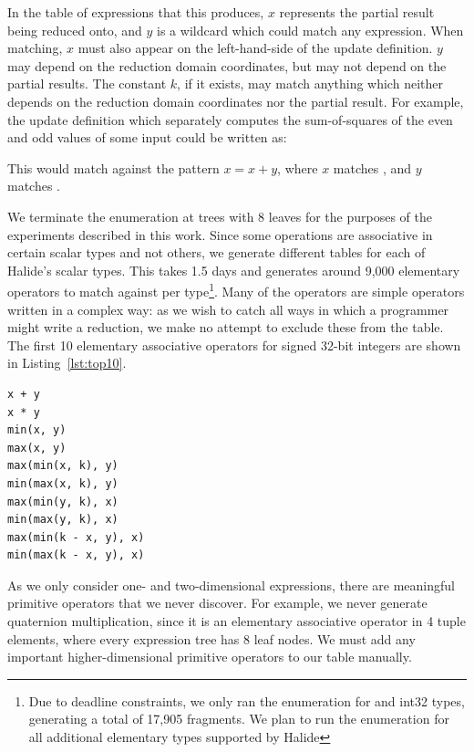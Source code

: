 In the table of expressions that this produces, $x$ represents the partial result being reduced onto, and $y$ is a wildcard which could match any expression. When matching, $x$ must also appear on the left-hand-side of the update definition. $y$ may depend on the reduction domain coordinates, but may not depend on the partial results. The constant $k$, if it exists, may match anything which neither depends on the reduction domain coordinates nor the partial result. For example, the update definition which separately computes the sum-of-squares of the even and odd values of some input  could be written as:


This would match against the pattern $x = x + y$, where $x$ matches , and $y$ matches .

We terminate the enumeration at trees with 8 leaves for the purposes of the experiments described in this work. Since some operations are associative in certain scalar types and not others, we generate different tables for each of Halide's scalar types.  This takes 1.5 days and generates around 9,000 elementary operators to match against per type\footnote{Due to deadline constraints, we only ran the enumeration for  and {int32} types, generating a total of 17,905 fragments.  We plan to run the enumeration for all additional elementary types supported by Halide}. Many of the operators are simple operators written in a complex way: as we wish to catch all ways in which a programmer might write a reduction, we make no attempt to exclude these from the table. The first 10 elementary associative operators for signed 32-bit integers are shown in Listing~\ref{lst:top10}.

\begin{lstlisting}[caption={The first 10 elementary associative operators for 32-bit signed integers}, label={lst:top10}]
x + y
x * y
min(x, y)
max(x, y)
max(min(x, k), y)
min(max(x, k), y)
max(min(y, k), x)
min(max(y, k), x)
max(min(k - x, y), x)
min(max(k - x, y), x)
\end{lstlisting}


As we only consider one- and two-dimensional expressions, there are meaningful primitive operators that we never discover. For example, we never generate quaternion multiplication, since it is an elementary associative operator in 4 tuple elements, where every expression tree has 8 leaf nodes. We must add any important higher-dimensional primitive operators to our table manually.

